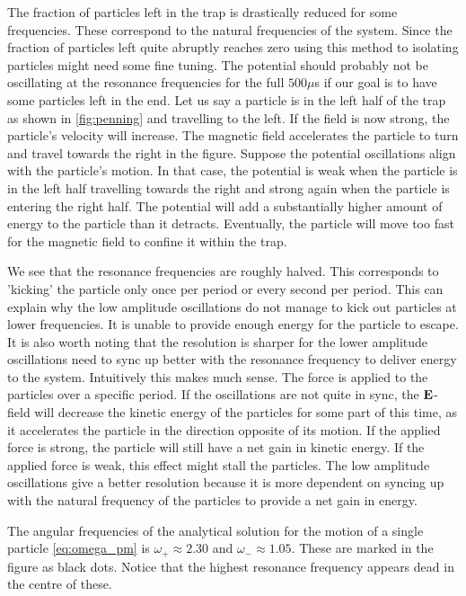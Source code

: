 The fraction of particles left in the trap is drastically reduced for some frequencies.
These correspond to the natural frequencies of the system.
Since the fraction of particles left quite abruptly reaches zero using this method to
isolating particles might need some fine tuning. The potential should probably not
be oscillating at the resonance frequencies for the full $500 \mu$s if our goal is to have some particles
left in the end.
Let us say a particle is in the left half of the trap as shown in \autoref{fig:penning} and travelling to the
left. If the field is now strong, the particle's velocity will increase. The magnetic field accelerates the
particle to turn and travel towards the right in the figure. Suppose the potential oscillations align with
the particle's motion. In that case, the potential is weak when the particle is in the left half travelling
towards the right and strong again when the particle is entering the right half. The potential will add
a substantially higher amount of energy to the particle than it detracts. Eventually, the particle will
move too fast for the magnetic field to confine it within the trap.

We see that the resonance frequencies are roughly halved. This corresponds to 'kicking' the particle only once per period or every second per period. This can explain why the low amplitude oscillations do not manage to kick out particles at lower frequencies. It is unable to provide enough energy for the particle to escape. It is also worth noting that the resolution is sharper for
the lower amplitude oscillations need to sync up better with the resonance frequency to deliver energy to the system.
Intuitively this makes much sense. The force is applied to the particles over a specific period. If the oscillations are not quite in
sync, the $\bold{E}$-field will decrease the kinetic energy of the particles for some part of this time, as it accelerates the particle in the
direction opposite of its motion. If the applied force is strong, the particle will still have a net gain in kinetic energy. If the applied force is
weak, this effect might stall the particles. The low amplitude oscillations give a better resolution because it is more dependent on syncing
 up with the natural frequency of the particles to provide a net gain in energy.

The angular frequencies of the analytical solution for the motion of a single particle \ref{eq:omega_pm} is $\omega_{+} \approx 2.30$ and $\omega_{-} \approx 1.05$. These are marked in the figure
as black dots. Notice that the highest resonance frequency appears dead in the centre of these.


